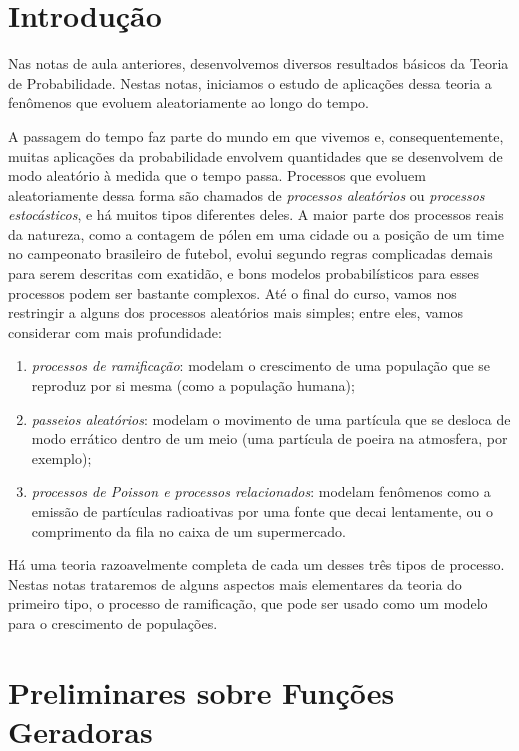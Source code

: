 \documentclass[12pt,portuguese]{article}
\theoremstyle{definition}
\theoremstyle{plainexercise}
\theoremstyle{starredexercise}
\theoremstyle{definition}
\begin{document}
\section{Introdução}\label{sec:introducao}

Nas notas de aula anteriores, desenvolvemos diversos resultados
básicos da Teoria de Probabilidade.
Nestas notas, iniciamos o estudo de aplicações dessa teoria
a fenômenos que evoluem aleatoriamente ao longo do tempo.

A passagem do tempo faz parte do mundo em que vivemos
e, consequentemente,
muitas aplicações da probabilidade envolvem quantidades
que se desenvolvem de modo aleatório à medida que o tempo passa.
Processos que evoluem aleatoriamente dessa forma são chamados de
\emph{processos aleatórios} ou \emph{processos estocásticos},
e há muitos tipos diferentes deles.
A maior parte dos processos reais da natureza,
como a contagem de pólen em uma cidade
ou a posição de um time no campeonato brasileiro de futebol,
evolui segundo regras complicadas demais
para serem descritas com exatidão,
e bons modelos probabilísticos para esses processos
podem ser bastante complexos.
Até o final do curso, vamos nos restringir a alguns dos processos aleatórios mais simples;
entre eles, vamos considerar com mais profundidade:
\begin{enumerate}[label=(\alph*)]
  \item \emph{processos de ramificação}: modelam o crescimento de uma
        população que se reproduz por si mesma (como a população humana);
  \item \emph{passeios aleatórios}: modelam o movimento de uma partícula
        que se desloca de modo errático dentro de um meio (uma partícula
        de poeira na atmosfera, por exemplo);
  \item \emph{processos de Poisson e processos relacionados}: modelam
        fenômenos como a emissão de partículas radioativas por uma fonte
        que decai lentamente, ou o comprimento da fila no caixa de um
        supermercado.
\end{enumerate}
Há uma teoria razoavelmente completa de cada um desses três tipos de
processo. Nestas notas trataremos de alguns aspectos mais elementares
da teoria do primeiro tipo, o processo de ramificação, 
que pode ser usado como um modelo para o crescimento de populações. 

\section{Preliminares sobre Funções Geradoras}\label{sec:preliminares-fgp}
\end{document}
